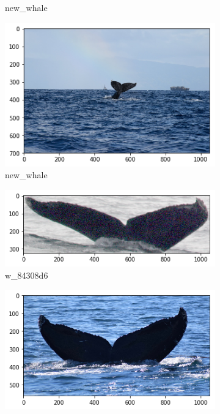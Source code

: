 \begin{frame}[c]
\begin{figure}
\begin{subfigure}[b]{0.24\linewidth}
            \caption{new\_whale}
        \end{subfigure}
        \begin{subfigure}[b]{0.24\linewidth}
            \centering
            \includegraphics[width=\linewidth]{Whales/new_whale6.png}
            \caption{new\_whale}
        \end{subfigure}
        \begin{subfigure}[b]{0.24\linewidth}
            \centering
            \includegraphics[width=\linewidth]{Whales/w_84308d6.png}
            \caption{w\_84308d6}
        \end{subfigure}
        \begin{subfigure}[b]{0.24\linewidth}
            \centering
            \includegraphics[width=\linewidth]{Whales/w_e1ffbe2.png}

\end{subfigure}
\end{figure}
\end{frame}
